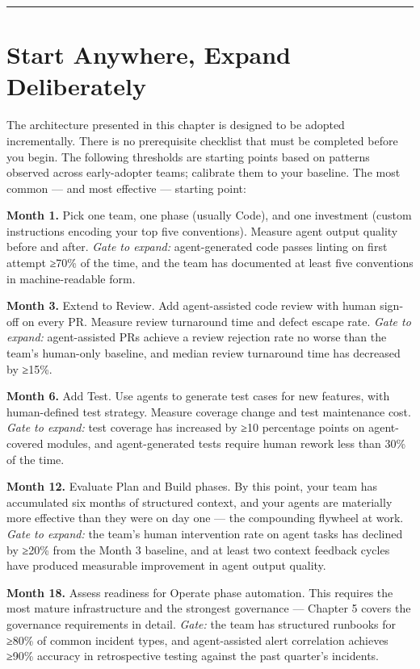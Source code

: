 \documentclass[
  a4paper,
  DIV=11,
  numbers=noendperiod]{scrreprt}
\begin{document}
\begin{center}\rule{0.5\linewidth}{0.5pt}\end{center}

\section{Start Anywhere, Expand
Deliberately}\label{start-anywhere-expand-deliberately}

The architecture presented in this chapter is designed to be adopted
incrementally. There is no prerequisite checklist that must be completed
before you begin. The following thresholds are starting points based on
patterns observed across early-adopter teams; calibrate them to your
baseline. The most common --- and most effective --- starting point:

\textbf{Month 1.} Pick one team, one phase (usually Code), and one
investment (custom instructions encoding your top five conventions).
Measure agent output quality before and after. \emph{Gate to expand:}
agent-generated code passes linting on first attempt ≥70\% of the time,
and the team has documented at least five conventions in
machine-readable form.

\textbf{Month 3.} Extend to Review. Add agent-assisted code review with
human sign-off on every PR. Measure review turnaround time and defect
escape rate. \emph{Gate to expand:} agent-assisted PRs achieve a review
rejection rate no worse than the team's human-only baseline, and median
review turnaround time has decreased by ≥15\%.

\textbf{Month 6.} Add Test. Use agents to generate test cases for new
features, with human-defined test strategy. Measure coverage change and
test maintenance cost. \emph{Gate to expand:} test coverage has
increased by ≥10 percentage points on agent-covered modules, and
agent-generated tests require human rework less than 30\% of the time.

\textbf{Month 12.} Evaluate Plan and Build phases. By this point, your
team has accumulated six months of structured context, and your agents
are materially more effective than they were on day one --- the
compounding flywheel at work. \emph{Gate to expand:} the team's human
intervention rate on agent tasks has declined by ≥20\% from the Month 3
baseline, and at least two context feedback cycles have produced
measurable improvement in agent output quality.

\textbf{Month 18.} Assess readiness for Operate phase automation. This
requires the most mature infrastructure and the strongest governance ---
Chapter 5 covers the governance requirements in detail. \emph{Gate:} the
team has structured runbooks for ≥80\% of common incident types, and
agent-assisted alert correlation achieves ≥90\% accuracy in
retrospective testing against the past quarter's incidents.
\end{document}
